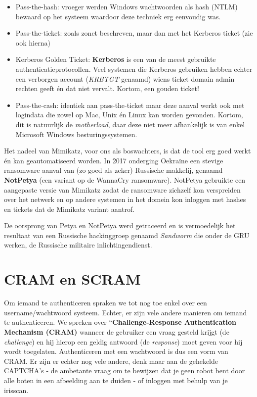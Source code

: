 \documentclass[
  10pt,
  dutch,
  paper=a4,
  ,captions=tableheading
]{scrbook}
\providecommand{\tightlist}{%
  \setlength{\itemsep}{0pt}\setlength{\parskip}{0pt}}
\begin{document}
\begin{itemize}
\tightlist
\item
  Pass-the-hash: vroeger werden Windows wachtwoorden als hash (NTLM)
  bewaard op het systeem waardoor deze techniek erg eenvoudig was.
\item
  Pass-the-ticket: zoals zonet beschreven, maar dan met het Kerberos
  ticket (zie ook hierna)
\item
  Kerberos Golden Ticket: \textbf{Kerberos} is een van de meest
  gebruikte authenticatieprotocollen. Veel systemen die Kerberos
  gebruiken hebben echter een verborgen account (\emph{KRBTGT} genaamd)
  wiens ticket domain admin rechten geeft én dat niet vervalt. Kortom,
  een gouden ticket!
\item
  Pass-the-cash: identiek aan pass-the-ticket maar deze aanval werkt ook
  met logindata die zowel op Mac, Unix én Linux kan worden gevonden.
  Kortom, dit is natuurlijk de \emph{motherload}, daar deze niet meer
  afhankelijk is van enkel Microsoft Windows besturingssystemen.
\end{itemize}

Het nadeel van Mimikatz, voor ons als boswachters, is dat de tool erg
goed werkt én kan geautomatiseerd worden. In 2017 onderging Oekraïne een
stevige ransomware aanval van (zo goed als zeker) Russische makkelij,
genaamd \textbf{NotPetya} (een variant op de WannaCry ransomware).
NotPetya gebruikte een aangepaste versie van Mimikatz zodat de
ransomware zichzelf kon verspreiden over het netwerk en op andere
systemen in het domein kon inloggen met hashes en tickets dat de
Mimikatz variant aantrof.

\begin{tipblock}
De oorsprong van Petya en NotPetya werd getraceerd en is vermoedelijk
het resultaat van een Russische hackinggroep genaamd \emph{Sandworm} die
onder de GRU werken, de Russische militaire inlichtingendienst.
\end{tipblock}

\section{CRAM en SCRAM}\label{cram-en-scram}

Om iemand te authenticeren spraken we tot nog toe enkel over een
username/wachtwoord systeem. Echter, er zijn vele andere manieren om
iemand te authenticeren. We spreken over ``\textbf{Challenge-Response
Authentication Mechanism (CRAM)} wanneer de gebruiker een vraag gesteld
krijgt (de \emph{challenge}) en hij hierop een geldig antwoord (de
\emph{response}) moet geven voor hij wordt toegelaten. Authenticeren met
een wachtwoord is dus een vorm van CRAM. Er zijn er echter nog vele
andere, denk maar aan de gehekelde CAPTCHA's - de ambetante vraag om te
bewijzen dat je geen robot bent door alle boten in een afbeelding aan te
duiden - of inloggen met behulp van je irisscan.
\end{document}

